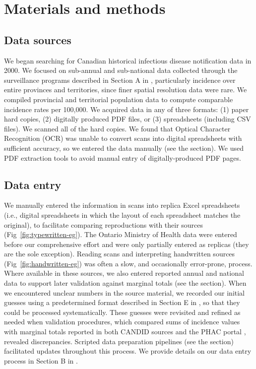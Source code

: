 \documentclass[10pt,letterpaper]{article}
\begin{document}
\section*{Materials and methods}
\subsection*{Data sources}\label{sec:data-sources}

We began searching for Canadian historical infectious disease notification data in 2000. We focused on sub-annual and sub-national data collected through the surveillance programs described in Section A in , particularly incidence over entire provinces and territories, since finer spatial resolution data were rare. We compiled provincial and territorial population data \cite{canada1925sixth,statistics1973population,statcan2021population} to compute comparable incidence rates per 100,000. We acquired data in any of three formats: (1) paper hard copies, (2) digitally produced PDF files, or (3) spreadsheets (including CSV files). We scanned all of the hard copies. We found that Optical Character Recognition (OCR) was unable to convert scans into digital spreadsheets with sufficient accuracy, so we entered the data manually (see the  section). We used PDF extraction tools \cite{PDFTables} to avoid manual entry of digitally-produced PDF pages.

\subsection*{Data entry}\label{sec:data-entry}

We manually entered the information in scans into replica Excel spreadsheets (i.e., digital spreadsheets in which the layout of each spreadsheet matches the original), to facilitate comparing reproductions with their sources (Fig~\ref{fig:typewritten-eg}). The Ontario Ministry of Health data were entered before our comprehensive effort and were only partially entered as replicas (they are the sole exception). Reading scans and interpreting handwritten sources (Fig~\ref{fig:handwritten-eg}) was often a slow, and occasionally error-prone, process. Where available in these sources, we also entered reported annual and national data to support later validation against marginal totals (see the  section). When we encountered unclear numbers in the source material, we recorded our initial guesses using a predetermined format described in Section E in , so that they could be processed systematically. These guesses were revisited and refined as needed when validation procedures, which compared sums of incidence values with marginal totals reported in both CANDID sources and the PHAC portal \cite{totten2019updates}, revealed discrepancies. Scripted data preparation pipelines (see the  section) facilitated updates throughout this process. We provide details on our data entry process in Section B in .
\end{document}
